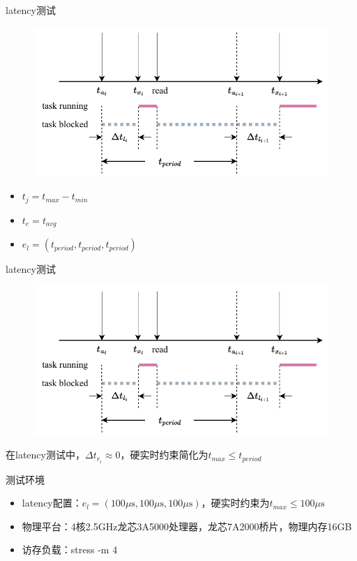 \documentclass{beamer}
\begin{document}
\begin{frame}{latency测试}
    \begin{figure}[!htbp]
        \includegraphics[width=.8\textwidth]{img/Img/latency-time-line.pdf}
    \end{figure}
    \begin{itemize}
        \item $t_j=t_{max}-t_{min}$
        \item $t_e=t_{avg}$
        \item $e_l=(t_{period}, t_{period}, t_{period})$
    \end{itemize}
\end{frame}

\begin{frame}{latency测试}
    \begin{figure}[!htbp]
        \includegraphics[width=.8\textwidth]{img/Img/latency-time-line.pdf}
    \end{figure}
    在latency测试中，$\Delta t_{r_i}\approx 0$，硬实时约束简化为$t_{max}\le t_{period}$
\end{frame}

\begin{frame}{测试环境}
    \begin{itemize}
        \item latency配置：$e_l=(100\mu \text{s}, 100\mu \text{s}, 100\mu \text{s})$，硬实时约束为$t_{max}\le 100\mu \text{s}$
        \item 物理平台：4核2.5GHz龙芯3A5000处理器，龙芯7A2000桥片，物理内存16GB
        \item 访存负载：{\ttfamily stress -m 4}
    \end{itemize}
\end{frame}
\end{document}
